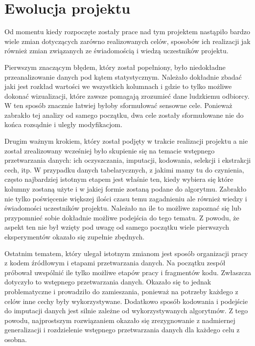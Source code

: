 \documentclass{classrep}
\begin{document}
    \section{Ewolucja projektu} {
        Od momentu kiedy rozpoczęte zostały prace nad tym projektem nastąpiło bardzo
        wiele zmian dotyczących zarówno realizowanych celów, sposobów ich realizacji
        jak również zmian związanych ze świadomością i wiedzą uczestników projektu.

        Pierwszym znaczącym błędem, który został popełniony, było niedokładne
        przeanalizowanie danych pod kątem statystycznym. Należało dokładnie zbadać jaki
        jest rozkład wartości we wszystkich kolumnach i gdzie to tylko możliwe dokonać
        wizualizacji, które zawsze pomagają zrozumieć dane ludzkiemu odbiorcy. W ten
        sposób znacznie łatwiej byłoby sformułować sensowne cele. Ponieważ zabrakło tej
        analizy od samego początku, dwa cele zostały sformułowane nie do końca
        rozsądnie i uległy modyfikacjom.

        Drugim ważnym krokiem, który został podjęty w trakcie realizacji projektu a nie
        został zrealizowany wcześniej było skupienie się na temacie wstępnego
        przetwarzania danych: ich oczyszczania, imputacji, kodowania, selekcji i
        ekstrakcji cech, itp. W przypadku danych tabelarycznych, z jakimi mamy tu do
        czynienia, często najbardziej istotnym etapem jest właśnie ten, kiedy wybiera
        się które kolumny zostaną użyte i w jakiej formie zostaną podane do algorytmu.
        Zabrakło nie tylko poświęcenie większej ilości czasu temu zagadnieniu ale
        również wiedzy i świadomości uczestników projektu. Należało na ile to możliwe
        zapoznać się lub przypomnieć sobie dokładnie możliwe podejścia do tego tematu.
        Z powodu, że aspekt ten nie był wzięty pod uwagę od samego początku wiele
        pierwszych eksperymentów okazało się zupełnie zbędnych.

        Ostatnim tematem, który ulegał istotnym zmianom jest sposób organizacji pracy z
        kodem źródłowym i etapami przetwarzania danych. Na początku zespół próbował
        uwspólnić ile tylko możliwe etapów pracy i fragmentów kodu. Zwłaszcza dotyczyło
        to wstępnego przetwarzania danych. Okazało się to jednak problematyczne i
        prowadziło do zamieszania, ponieważ na potrzeby każdego z celów inne cechy były
        wykorzystywane. Dodatkowo sposób kodowania i podejście do imputacji danych jest
        silnie zależne od wykorzystywanych algorytmów. Z tego powodu, najprostszym
        rozwiązaniem okazało się zrezygnowanie z nadmiernej generalizacji i
        rozdzielenie wstępnego przetwarzania danych dla każdego celu z osobna.
    }
\end{document}
